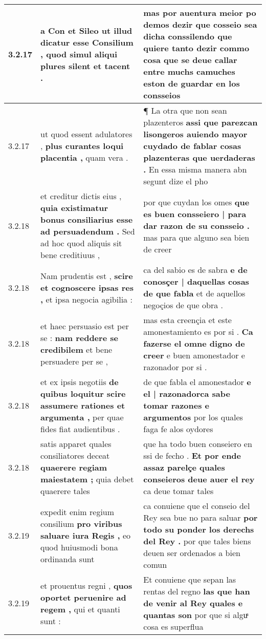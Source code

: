 \begin{tabular}{|p{1cm}|p{6.5cm}|p{6.5cm}|}
3.2.17 & a Con et Sileo \textbf{ ut illud dicatur esse Consilium , } quod simul aliqui plures silent et tacent . & mas por auentura meior po demos \textbf{ dezir que cosseio sea dicha conssilendo } que quiere tanto dezir commo cosa que se deue callar entre muchs camuches eston de guardar en los consseios \\\hline
3.2.17 & ut quod essent adulatores , \textbf{ plus curantes loqui placentia , } quam vera . & ¶ La otra que non sean plazenteros \textbf{ assi que parezcan lisongeros auiendo mayor cuydado de fablar cosas plazenteras que uerdaderas . } En essa misma manera abn segunt dize el pho \\\hline
3.2.18 & et creditur dictis eius , \textbf{ quia existimatur bonus consiliarius esse ad persuadendum . } Sed ad hoc quod aliquis sit bene creditiuus , & por que cuydan los omes \textbf{ que es buen consseiero | para dar razon de su consseio . } mas para que alguno sea bien de creer \\\hline
3.2.18 & Nam prudentis est , \textbf{ scire et cognoscere ipsas res , } et ipsa negocia agibilia : & ca del sabio es de sabra \textbf{ e de conosçer | daquellas cosas de que fabla } et de aquellos negoçios de que obra . \\\hline
3.2.18 & et haec persuasio est per se : \textbf{ nam reddere se credibilem } et bene persuadere per se , & mas esta creençia et este amonestamiento es por si . \textbf{ Ca fazerse el omne digno de creer } e buen amonestador e razonador por si . \\\hline
3.2.18 & et ex ipsis negotiis \textbf{ de quibus loquitur scire assumere rationes et argumenta , } per quae fides fiat audientibus . & de que fabla el amonestador \textbf{ e el | razonadorca sabe tomar razones e argumentos } por los quales faga fe alos oydores \\\hline
3.2.18 & satis apparet quales consiliatores deceat \textbf{ quaerere regiam maiestatem ; } quia debet quaerere tales & que ha todo buen conseiero en ssi de fecho . \textbf{ Et por ende assaz parelçe quales conseieros deue auer el rey } ca deue tomar tales \\\hline
3.2.19 & expedit enim regium consilium \textbf{ pro viribus saluare iura Regis , } eo quod huiusmodi bona ordinanda sunt & ca conuiene que el conseio del Rey sea bue no para saluar \textbf{ por todo su ponder los derechs del Rey . } por que tales biens deuen ser ordenados a bien comun \\\hline
3.2.19 & et prouentus regni , \textbf{ quos oportet peruenire ad regem , } qui et quanti sunt : & Et conuiene que sepan las rentas del regno \textbf{ las que han de venir al Rey quales e quantas son } por que si alguͣ cosa es superflua \\\hline

\end{tabular}
